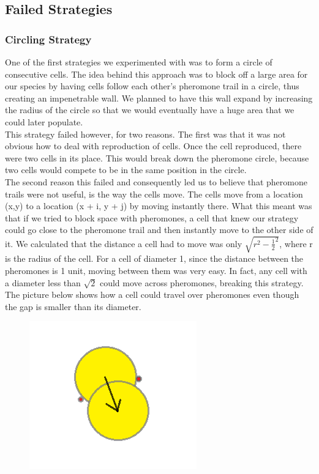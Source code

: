 \subsection{Failed Strategies}
\subsubsection{Circling Strategy}
One of the first strategies we experimented with was to form a circle of consecutive cells. The idea behind this approach was to block off a large area for our species by having cells follow each other’s pheromone trail in a circle, thus creating an impenetrable wall. We planned to have this wall expand by increasing the radius of the circle so that we would eventually have a huge area that we could later populate.\\
This strategy failed however, for two reasons. The first was that it was not obvious how to deal with reproduction of cells. Once the cell reproduced, there were two cells in its place. This would break down the pheromone circle, because two cells would compete to be in the same position in the circle.\\
The second reason this failed and consequently led us to believe that pheromone trails were not useful, is the way the cells move. The cells move from a location (x,y) to a location (x + i, y + j) by moving instantly there. What this meant was that if we tried to block space with pheromones, a cell that knew our strategy could go close to the pheromone trail and then instantly move to the other side of it. We calculated that the distance a cell had to move was only $\sqrt{r^2 - \frac{1}{2}^2}$, where r is the radius of the cell. For a cell of diameter 1, since the distance between the pheromones is 1 unit, moving between them was very easy. In fact, any cell with a diameter less than $\sqrt{2}$ could move across pheromones, breaking this strategy. The picture below shows how a cell could travel over pheromones even though the gap is smaller than its diameter.\\

\begin{figure}[h]
\center
\includegraphics[scale=1]{Circle.png}
\caption{}
\label{fig:circle}
\end{figure}

